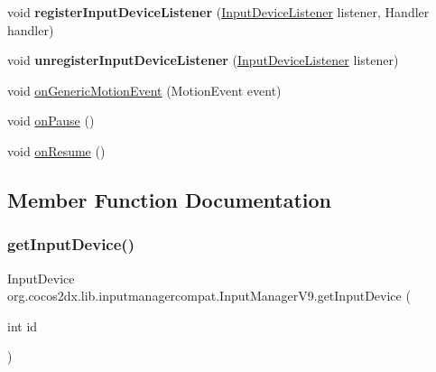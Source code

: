 \begin{DoxyCompactItemize}
\item 
\mbox{\label{classorg_1_1cocos2dx_1_1lib_1_1inputmanagercompat_1_1InputManagerV9_a76a95859d7d38e1fd3b7dd545af932aa}} 
void {\bfseries register\+Input\+Device\+Listener} (\hyperlink{interfaceorg_1_1cocos2dx_1_1lib_1_1inputmanagercompat_1_1InputManagerCompat_1_1InputDeviceListener}{Input\+Device\+Listener} listener, Handler handler)
\item 
\mbox{\label{classorg_1_1cocos2dx_1_1lib_1_1inputmanagercompat_1_1InputManagerV9_ac6f6bbce11deb149571341b3909d6afa}} 
void {\bfseries unregister\+Input\+Device\+Listener} (\hyperlink{interfaceorg_1_1cocos2dx_1_1lib_1_1inputmanagercompat_1_1InputManagerCompat_1_1InputDeviceListener}{Input\+Device\+Listener} listener)
\item 
void \hyperlink{classorg_1_1cocos2dx_1_1lib_1_1inputmanagercompat_1_1InputManagerV9_aa7e7451896e351e520f511388907fde9}{on\+Generic\+Motion\+Event} (Motion\+Event event)
\item 
void \hyperlink{classorg_1_1cocos2dx_1_1lib_1_1inputmanagercompat_1_1InputManagerV9_ab80665476c8b79b16cbea8b2679effc6}{on\+Pause} ()
\item 
void \hyperlink{classorg_1_1cocos2dx_1_1lib_1_1inputmanagercompat_1_1InputManagerV9_a94c18cf8110be2479e6cb8d9528b57d5}{on\+Resume} ()
\end{DoxyCompactItemize}


\subsection{Member Function Documentation}
\mbox{\label{classorg_1_1cocos2dx_1_1lib_1_1inputmanagercompat_1_1InputManagerV9_a86e8c5b196c4f0707dccc1d0f6b1d0dd}} 
\subsubsection{\texorpdfstring{get\+Input\+Device()}{getInputDevice()}\hspace{0.1cm}{\footnotesize\ttfamily [1/2]}}
{\footnotesize\ttfamily Input\+Device org.\+cocos2dx.\+lib.\+inputmanagercompat.\+Input\+Manager\+V9.\+get\+Input\+Device (\begin{DoxyParamCaption}\item[{int}]{id }\end{DoxyParamCaption})\hspace{0.3cm}{\ttfamily [inline]}}

